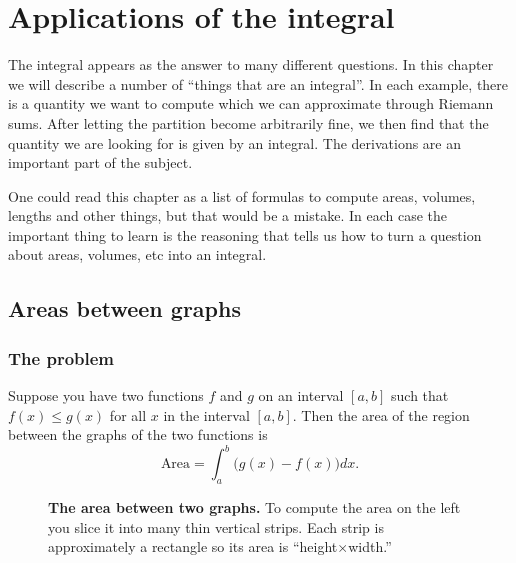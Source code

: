\chapter{Applications of the integral}
The integral appears as the answer to many different questions.  In this chapter
we will describe a number of ``things that are an integral''.  In each example,
there is a quantity we want to compute which we can approximate through
Riemann sums.  After letting the partition become arbitrarily fine, we then find
that the quantity we are looking for is given by an integral.  The derivations
are an important part of the subject.

One could read this chapter as a list of formulas to compute areas, volumes,
lengths and other things, but that would be a mistake.  In each case the
important thing to learn is the reasoning that tells us how to turn a question
about areas, volumes, etc into an integral.

\section{Areas between graphs} %
\subsection{The problem} %
Suppose you have two functions $f$ and $g$ on an interval $[a,b]$ such that
$f(x)\leq g(x)$
for all $x$ in the interval $[a,b]$.  Then the area of the region between the
graphs of the two functions is
\begin{equation}
  \label{eq:area-between-graphs}
  \textrm{Area} = \int_a^b \bigl(g(x) - f(x) \bigr) dx.
\end{equation}
\begin{figure}[h]
  \leftline{ 
     {\sffamily\footnotesize%
       } }
  
  \caption{\textbf{The area between two graphs. } %
    To compute the area on the left you slice it into many thin vertical strips.
    Each strip is approximately a rectangle so its area is
    ``height$\times$width.''  }

\end{figure}
